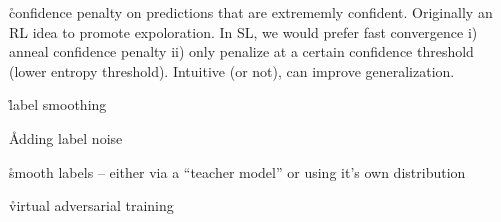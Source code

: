 \r{confidence penalty on predictions that are extrememly confident\cite{pereyra2017regularizing}. Originally an RL idea to promote expoloration. In SL, we would prefer fast convergence i) anneal confidence penalty ii) only penalize at a certain confidence threshold (lower entropy threshold). Intuitive (or not), can improve generalization.}

\r{label smoothing\cite{szegedy2016rethinking}}

\r{Adding label noise\cite{xie2016disturblabel}}

\r{smooth labels -- either via a ``teacher model''\cite{hinton2015distilling} or using it's own distribution\cite{reed2014training}}


\r{virtual adversarial training\cite{miyato2018virtual}}